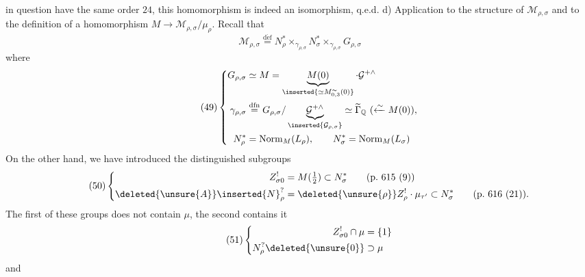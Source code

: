 in question have the same order $24$, this homomorphism is indeed an isomorphism, q.e.d.
d) Application to the structure of $\mathcal M_{\rho,\sigma}$ and to the definition of a homomorphism  $M\longrightarrow\mathcal M_{\rho,\sigma}/\mu_\rho$.
Recall that
\[
\tag{48}
\mathcal M_{\rho,\sigma}\overset{\mathrm{d\acute ef}}{=}
N_\rho^*\times_{\gamma_{\rho,\sigma}}N_\sigma^*\times_{\gamma_{\rho,\sigma}}G_{\rho,\sigma}
\]
where 
\[
\tag{49}
\left\{\begin{aligned}
G_{\rho,\sigma}&\simeq M=\underbrace{M(0)}_{\inserted{\simeq M_{0,3}^{\sim}(0)}}\cdot\mathcal G^{+\wedge}\\
\gamma_{\rho,\sigma}&\overset{\mathrm{dfn}}{=}G_{\rho,\sigma}/\underbrace{\mathcal G^{+\wedge}}_{\inserted{\mathcal G_{\rho,\sigma}}}\simeq\widetilde{\Gamma}_{\mathbb Q}\ (\xleftarrow{\sim}M(0)),\\
N_\rho^*&=\operatorname{Norm}_M(L_\rho),\qquad N_\sigma^{*}=\operatorname{Norm}_M(L_\sigma)
\end{aligned}\right.
\]
On the other hand, we have introduced the distinguished subgroups
\[
\tag{50}
\left\{\begin{aligned}
Z_{\sigma0}^!&=M(\tfrac12)\subset N_\sigma^*\qquad(\mathrm{p.}\ 615\ (9))\\
\deleted{\unsure{A}}\inserted{N}_\rho^?&=\deleted{\unsure{\rho}}Z_\rho^!\cdot\mu_{\tau'}\subset N_\sigma^*\qquad(\mathrm{p.}\ 616\ (21)).
\end{aligned}\right.
\]
The first of these groups does not contain $\mu$, the second contains it
\[
\tag{51}
\left\{\begin{aligned}
Z_{\sigma0}^!\cap\mu&=\{1\}\\
N_\rho^?\deleted{\unsure{0}}&\supset\mu
\end{aligned}\right.
\]
and

